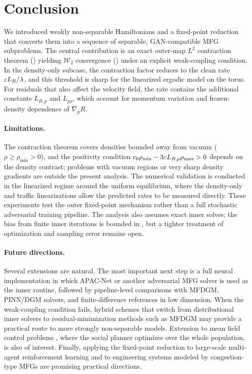 \section{Conclusion}
\label{sec:conclusion}

We introduced weakly non-separable Hamiltonians and a fixed-point reduction
that converts them into a sequence of separable, GAN-compatible MFG
subproblems. The central contribution is an exact outer-map $L^2$
contraction theorem () yielding $\mathcal{W}_2$ convergence
() under an explicit weak-coupling condition. In the
density-only subcase, the contraction factor reduces to the clean rate
$\varepsilon L_R/\lambda$, and this threshold is sharp for the linearized ergodic
model on the torus. For residuals that also affect the velocity field, the
rate contains the additional constants $L_{R,p}$ and $L_{p\rho}$, which
account for momentum variation and frozen-density dependence of
$\nabla_pR$.

\paragraph{Limitations.}
The contraction theorem covers densities bounded away from vacuum
($\rho \geq \rho_{\min} > 0$), and the positivity condition
$c_0\rho_{\min}-3\varepsilon L_{R,p}\rho_{\max}>0$ depends on the density contrast;
problems with vacuum regions or very sharp density gradients are outside
the present analysis. The numerical validation is conducted in the
linearized regime around the uniform equilibrium, where the density-only
and traffic linearizations allow the predicted rates to be measured
directly. These experiments test the outer fixed-point mechanism rather
than a full stochastic adversarial training pipeline.
The analysis also assumes exact inner solves; the bias from finite
inner iterations is bounded in , but a tighter treatment
of optimization and sampling error remains open.

\paragraph{Future directions.}
Several extensions are natural.
The most important next step is a full neural implementation in which
APAC-Net or another adversarial MFG solver is used as the inner routine,
followed by pipeline-level comparisons with MFDGM, PINN/DGM solvers, and
finite-difference references in low dimension.
When the weak-coupling condition fails, hybrid schemes that switch from
distributional inner solvers to residual-minimization methods such as MFDGM
may provide a practical route to more strongly non-separable models.
Extension to mean field control problems \citep{carmona2018probabilistic},
where the social planner optimizes over the whole population, is also
of interest.
Finally, applying the fixed-point reduction to large-scale multi-agent
reinforcement learning and to engineering systems modeled by
congestion-type MFGs are promising practical directions.

